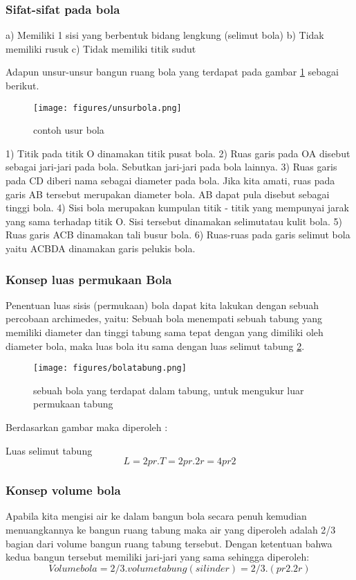 \subsubsection{Sifat-sifat pada bola} 
a) Memiliki 1 sisi yang berbentuk bidang lengkung (selimut bola) 
b) Tidak memiliki rusuk 
c) Tidak memiliki titik sudut
 
Adapun unsur-unsur bangun ruang bola yang terdapat pada gambar \ref{unsurbola} sebagai berikut.
\begin{figure}[ht]
    \centerline{\texttt{[image: figures/unsurbola.png]}}
    \caption{contoh usur bola}
    \label{unsurbola}
    \end{figure}
1) Titik pada titik O dinamakan titik pusat bola.
2) Ruas garis pada OA disebut sebagai jari-jari pada bola. Sebutkan jari-jari pada bola lainnya.
3) Ruas garis pada CD diberi nama sebagai diameter pada bola. Jika kita amati, ruas pada garis AB tersebut merupakan diameter bola. AB dapat pula disebut sebagai tinggi bola.
4) Sisi bola merupakan kumpulan titik - titik yang mempunyai jarak yang sama terhadap titik O. Sisi tersebut dinamakan selimutatau kulit bola.
5) Ruas garis ACB dinamakan tali busur bola.
6) Ruas-ruas pada garis selimut bola yaitu ACBDA dinamakan garis pelukis bola.

\subsubsection{Konsep luas permukaan Bola}
Penentuan luas sisis (permukaan) bola dapat kita lakukan dengan sebuah percobaan archimedes, yaitu:
Sebuah bola menempati sebuah tabung yang memiliki diameter dan tinggi tabung sama tepat dengan 
yang dimiliki oleh diameter bola, maka luas bola itu sama dengan luas selimut tabung \ref{bolatabung}.
\begin{figure}[ht]
    \centerline{\texttt{[image: figures/bolatabung.png]}}
    \caption{sebuah bola yang terdapat dalam tabung, untuk mengukur luar permukaan tabung}
    \label{bolatabung}
    \end{figure} 
Berdasarkan gambar maka diperoleh :

Luas selimut tabung 
\begin{equation}
					L= 2 pr. T
                    = 2pr. 2r
                    = 4pr2
\end{equation}
            
\subsubsection{Konsep volume bola}
Apabila kita mengisi air ke dalam bangun bola secara penuh 
kemudian menuangkannya ke bangun ruang tabung maka air yang diperoleh adalah 2/3 bagian dari volume bangun ruang tabung tersebut. 
Dengan ketentuan bahwa kedua bangun tersebut memiliki jari-jari yang sama sehingga diperoleh:
\begin{equation}
Volume bola = 2/3 . volume tabung(silinder)
            = 2/3 . (pr2 . 2r)
\end{equation}

